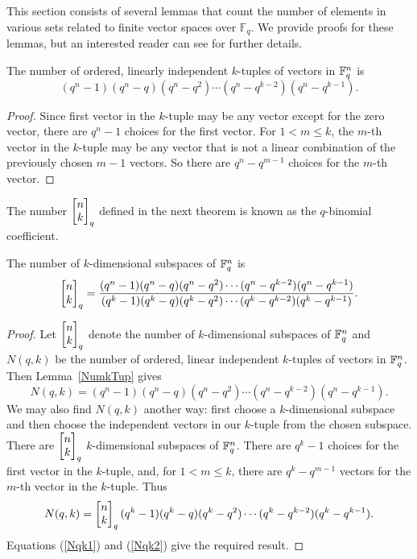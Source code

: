 This section consists of several lemmas that count the number of elements in various sets related to finite vector spaces over $\mathbb{F}_q$.  We provide proofs for these lemmas, but an interested reader can see \cite{stanley2011enumerative} for further details. 
\begin{lemma}\label{NumkTup}
  The number of ordered, linearly independent $k$-tuples of vectors in $\mathbb{F}_q^{n}$  is
\[
(q^n-1)(q^n-q)(q^n-q^2)\cdots(q^n - q^{k-2})(q^n-q^{k-1}).
\]
\end{lemma}

\begin{proof}
Since first vector in the $k$-tuple may be any vector except for the zero vector, there are $q^n-1$ choices for the first vector.  For $1<m \leq k$, the $m$-th vector in the $k$-tuple may be any vector that is not a linear combination of the previously chosen $m-1$ vectors. So there are $q^n - q^{m-1}$ choices for the $m$-th vector.
\end{proof}

The number $\begin{bmatrix}{n}\\ {k}\end{bmatrix}_q$ defined in the next theorem is known as the $q$-binomial coefficient.

\begin{lemma}\label{NumkSub}
  The number of $k$-dimensional subspaces of $\mathbb{F}_q^{n}$ is
\[
\begin{bmatrix}{n}\\ {k}\end{bmatrix}_q = \frac{(q^n-1)(q^n-q)(q^n-q^2)\cdots(q^n - q^{k-2})(q^n-q^{k-1})}{(q^k-1)(q^k-q)(q^k-q^2)\cdots(q^k - q^{k-2})(q^k-q^{k-1})}.
\]
\end{lemma}


\begin{proof}
  Let $\begin{bmatrix}{n}\\ {k}\end{bmatrix}_q$ denote the number of $k$-dimensional subspaces of $\mathbb{F}_q^{n}$
  and $N(q,k)$ be the number of ordered, linear independent $k$-tuples of
  vectors in $\mathbb{F}_q^{n}$.  Then Lemma~\ref{NumkTup} gives
\begin{equation}\label{Nqk1}
N(q,k) = (q^n-1)(q^n-q)(q^n-q^2)\cdots(q^n - q^{k-2})(q^n-q^{k-1}).
\end{equation}
We may also find $N(q,k)$ another way: first choose a $k$-dimensional
subspace and then choose the independent vectors in our $k$-tuple from the
chosen subspace.  There are $\begin{bmatrix}{n}\\ {k}\end{bmatrix}_q$ $k$-dimensional subspaces of
$\mathbb{F}_q^{n}$.  There are $q^k-1$ choices for the first vector in the
$k$-tuple, and, for $1<m \leq k$, there are $q^k - q^{m-1}$ vectors for the
$m$-th vector in the $k$-tuple.  Thus
\begin{equation}\label{Nqk2}
N(q,k) = \begin{bmatrix}{n}\\ {k}\end{bmatrix}_q(q^k-1)(q^k-q)(q^k-q^2)\cdots(q^k - q^{k-2})(q^k-q^{k-1}).
\end{equation}
Equations (\ref{Nqk1}) and (\ref{Nqk2}) give the required result.
\end{proof}

